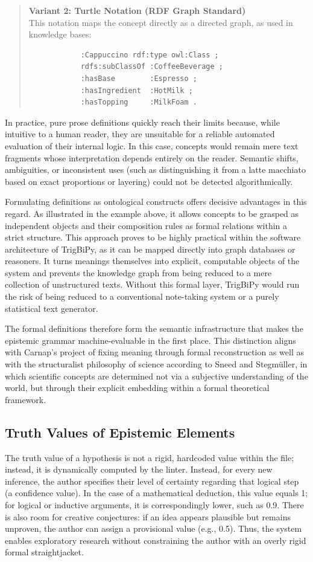 \documentclass[11pt, a4paper]{article}
\begin{document}
	\begin{quote}
		\textbf{Variant 2: Turtle Notation (RDF Graph Standard)} \\
		This notation maps the concept directly as a directed graph, as used in knowledge bases:
		\begin{verbatim}
			:Cappuccino rdf:type owl:Class ;
			rdfs:subClassOf :CoffeeBeverage ;
			:hasBase        :Espresso ;
			:hasIngredient  :HotMilk ;
			:hasTopping     :MilkFoam .
		\end{verbatim}
	\end{quote}
	
	In practice, pure prose definitions quickly reach their limits because, while intuitive to a human reader, they are unsuitable for a reliable automated evaluation of their internal logic. In this case, concepts would remain mere text fragments whose interpretation depends entirely on the reader. Semantic shifts, ambiguities, or inconsistent uses (such as distinguishing it from a latte macchiato based on exact proportions or layering) could not be detected algorithmically.
	
	Formulating definitions as ontological constructs offers decisive advantages in this regard. As illustrated in the example above, it allows concepts to be grasped as independent objects and their composition rules as formal relations within a strict structure. This approach proves to be highly practical within the software architecture of TrigBiPy, as it can be mapped directly into graph databases or reasoners. It turns meanings themselves into explicit, computable objects of the system and prevents the knowledge graph from being reduced to a mere collection of unstructured texts. Without this formal layer, TrigBiPy would run the risk of being reduced to a conventional note-taking system or a purely statistical text generator. 
	
	The formal definitions therefore form the semantic infrastructure that makes the epistemic grammar machine-evaluable in the first place. This distinction aligns with Carnap's project of fixing meaning through formal reconstruction as well as with the structuralist philosophy of science according to Sneed and Stegmüller, in which scientific concepts are determined not via a subjective understanding of the world, but through their explicit embedding within a formal theoretical framework.
	
	\subsection{Truth Values of Epistemic Elements} 
	The truth value of a hypothesis is not a rigid, hardcoded value within the file; instead, it is dynamically computed by the linter. Instead, for every new inference, the author specifies their level of certainty regarding that logical step (a confidence value). In the case of a mathematical deduction, this value equals 1; for logical or inductive arguments, it is correspondingly lower, such as 0.9. There is also room for creative conjectures: if an idea appears plausible but remains unproven, the author can assign a provisional value (e.g., 0.5). Thus, the system enables exploratory research without constraining the author with an overly rigid formal straightjacket. 
	
\end{document}
